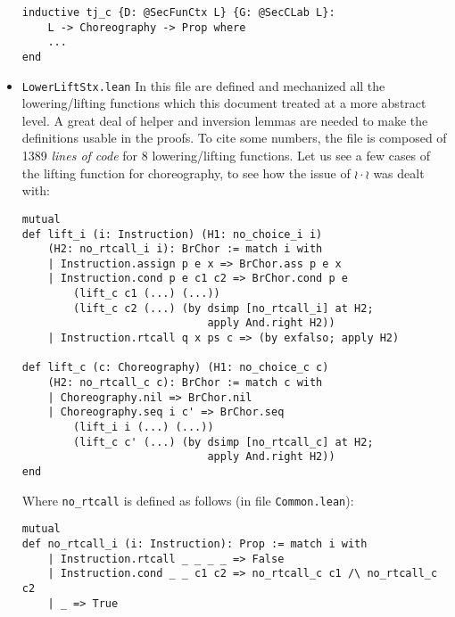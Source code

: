 \documentclass[12pt,a4paper,twoside]{book}
\begin{document}
\begin{itemize}
\begin{samepage}
\begin{verbatim}
inductive tj_c {D: @SecFunCtx L} {G: @SecCLab L}:
    L -> Choreography -> Prop where
    ...
end
\end{verbatim}
\end{samepage}
\item \texttt{LowerLiftStx.lean} In this file are defined and mechanized all the lowering/lifting functions which this document treated at a more abstract level. A great deal of helper and inversion lemmas are needed to make the definitions usable in the proofs. To cite some numbers, the file is composed of 1389 \emph{lines of code} for 8 lowering/lifting functions. Let us see a few cases of the lifting function for choreography, to see how the issue of $\wr \cdot \wr$ was dealt with:
\begin{samepage}
\begin{verbatim}
mutual
def lift_i (i: Instruction) (H1: no_choice_i i)
    (H2: no_rtcall_i i): BrChor := match i with
    | Instruction.assign p e x => BrChor.ass p e x
    | Instruction.cond p e c1 c2 => BrChor.cond p e
        (lift_c c1 (...) (...))
        (lift_c c2 (...) (by dsimp [no_rtcall_i] at H2;
                             apply And.right H2))
    | Instruction.rtcall q x ps c => (by exfalso; apply H2)

def lift_c (c: Choreography) (H1: no_choice_c c)
    (H2: no_rtcall_c c): BrChor := match c with
    | Choreography.nil => BrChor.nil
    | Choreography.seq i c' => BrChor.seq
        (lift_i i (...) (...))
        (lift_c c' (...) (by dsimp [no_rtcall_c] at H2;
                             apply And.right H2))
end
\end{verbatim}
\end{samepage}
Where \texttt{no\_rtcall} is defined as follows (in file \texttt{Common.lean}):
\begin{samepage}
\begin{verbatim}
mutual
def no_rtcall_i (i: Instruction): Prop := match i with
    | Instruction.rtcall _ _ _ _ => False
    | Instruction.cond _ _ c1 c2 => no_rtcall_c c1 /\ no_rtcall_c c2
    | _ => True


\end{verbatim}
\end{samepage}
\end{itemize}
\end{document}
